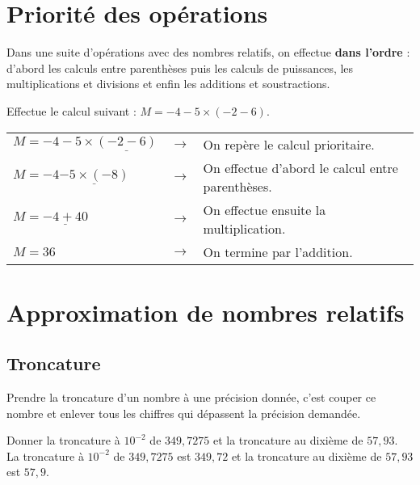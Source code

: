 \newpage
\section{Priorité des opérations}

\begin{aconnaitre}
Dans une suite d'opérations avec des nombres relatifs, on effectue \textbf{dans l'ordre} : d'abord les calculs entre parenthèses puis les calculs de puissances, les multiplications et divisions et enfin les additions et soustractions.
\end{aconnaitre}


\begin{exemple*1}
Effectue le calcul suivant : $M = -4 -5 \times (-2 -6)$.

\correction

\begin{tabular}{lcl}
$M = -4 -5 \times \underline{(-2 -6)}$ & $\rightarrow$ & On repère le calcul prioritaire. \\
$M = -4 \underline{-5 \times (-8)}$ & $\rightarrow$ & On effectue d'abord le calcul entre parenthèses. \\
$M = \underline{-4 + 40}$ & $\rightarrow$ & On effectue ensuite la multiplication. \\
$M = 36$ & $\rightarrow$ & On termine par l'addition. \\
\end{tabular}
\end{exemple*1}





\section{Approximation de nombres relatifs}

\subsection{Troncature}

\begin{definition}
Prendre la troncature d’un nombre à une précision donnée, c’est couper ce nombre et enlever tous les chiffres qui dépassent la précision demandée.
\end{definition}

\begin{exemple*1}
Donner la troncature à $10^{-2}$ de $349,7275$ et la troncature au dixième de $57,93$.
\correction
La troncature à $10^{-2}$ de $349,7275$ est $349,72$ et la troncature au dixième de $57,93$ est $57,9$.
\end{exemple*1}

